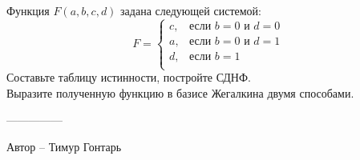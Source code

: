\question
Функция $F(a, b, c, d)$ задана следующей системой:
\begin{equation*}
    F =
    \begin{cases}
        c, &\text{если $b=0$ и $d=0$}\\
        a, &\text{если $b=0$ и $d=1$}\\
        d, &\text{если $b=1$}\\
    \end{cases}
\end{equation*}
Составьте таблицу истинности, постройте СДНФ.
\\
Выразите полученную функцию в базисе Жегалкина двумя способами.

---------------

Автор -- Тимур Гонтарь